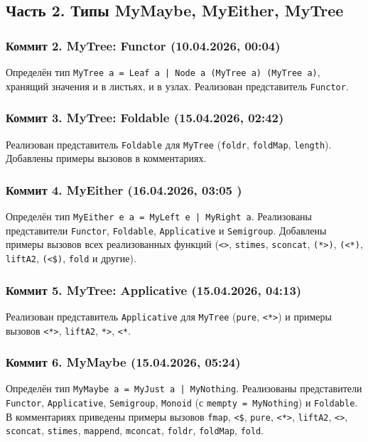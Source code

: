 \documentclass[a4paper, final]{article}
\begin{document}
\subsection{Часть 2. Типы MyMaybe, MyEither, MyTree}

\subsubsection{Коммит 2. MyTree: Functor (10.04.2026, 00:04)}

Определён тип \texttt{MyTree a = Leaf a | Node a (MyTree a) (MyTree a)},
хранящий значения и в листьях, и в узлах. Реализован представитель
\texttt{Functor}.

\subsubsection{Коммит 3. MyTree: Foldable (15.04.2026, 02:42)}

Реализован представитель \texttt{Foldable} для \texttt{MyTree} (\texttt{foldr},
\texttt{foldMap}, \texttt{length}). Добавлены примеры вызовов в комментариях.

\subsubsection{Коммит 4. MyEither (16.04.2026, 03:05 )}

Определён тип \texttt{MyEither e a = MyLeft e | MyRight a}. Реализованы
представители \texttt{Functor}, \texttt{Foldable}, \texttt{Applicative} и
\texttt{Semigroup}. Добавлены примеры вызовов всех реализованных функций
(\texttt{<>}, \texttt{stimes}, \texttt{sconcat}, \texttt{(*>)},
\texttt{(<*)}, \texttt{liftA2}, \texttt{(<\$)}, \texttt{fold} и другие).

\subsubsection{Коммит 5. MyTree: Applicative (15.04.2026, 04:13)}

Реализован представитель \texttt{Applicative} для \texttt{MyTree}
(\texttt{pure}, \texttt{<*>}) и примеры вызовов \texttt{<*>},
\texttt{liftA2}, \texttt{*>}, \texttt{<*}.

\subsubsection{Коммит 6. MyMaybe (15.04.2026, 05:24)}

Определён тип \texttt{MyMaybe a = MyJust a | MyNothing}. Реализованы
представители \texttt{Functor}, \texttt{Applicative}, \texttt{Semigroup},
\texttt{Monoid} (с \texttt{mempty = MyNothing}) и \texttt{Foldable}. В
комментариях приведены примеры вызовов \texttt{fmap}, \texttt{<\$},
\texttt{pure}, \texttt{<*>}, \texttt{liftA2}, \texttt{<>}, \texttt{sconcat},
\texttt{stimes}, \texttt{mappend}, \texttt{mconcat}, \texttt{foldr},
\texttt{foldMap}, \texttt{fold}.
\end{document}
